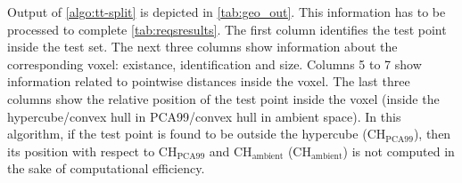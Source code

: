 %
\indent Output of \autoref{algo:tt-split} is depicted in \autoref{tab:geo_out}. This information has to be processed to complete \autoref{tab:reqsresults}. The first column identifies the test point inside the test set. The next three columns show information about the corresponding voxel: existance, identification and size. Columns 5 to 7 show information related to pointwise distances inside the voxel. The last three columns show the relative position of the test point inside the voxel (inside the hypercube/convex hull in PCA99/convex hull in ambient space). In this algorithm, if the test point is found to be outside the hypercube ($\text{CH}_{\text{PCA99}}$), then its position with respect to $\text{CH}_{\text{PCA99}}$ and $\text{CH}_{\text{ambient}}$ ($\text{CH}_{\text{ambient}}$) is not computed in the sake of computational efficiency.\\
